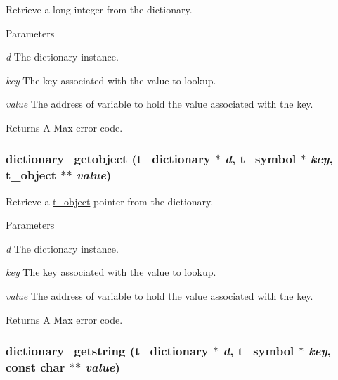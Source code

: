 Retrieve a long integer from the dictionary. 
\begin{DoxyParams}{Parameters}
\item[{\em d}]The dictionary instance. \item[{\em key}]The key associated with the value to lookup. \item[{\em value}]The address of variable to hold the value associated with the key. \end{DoxyParams}
\begin{DoxyReturn}{Returns}
A Max error code. 
\end{DoxyReturn}
\hypertarget{group__dictionary_gabcf91529e619908aebd380030c697052}{
\subsubsection[{dictionary\_\-getobject}]{ dictionary\_\-getobject ({\bf t\_\-dictionary} $\ast$ {\em d}, \/  {\bf t\_\-symbol} $\ast$ {\em key}, \/  {\bf t\_\-object} $\ast$$\ast$ {\em value})}}
\label{group__dictionary_gabcf91529e619908aebd380030c697052}


Retrieve a \hyperlink{structt__object}{t\_\-object} pointer from the dictionary. 
\begin{DoxyParams}{Parameters}
\item[{\em d}]The dictionary instance. \item[{\em key}]The key associated with the value to lookup. \item[{\em value}]The address of variable to hold the value associated with the key. \end{DoxyParams}
\begin{DoxyReturn}{Returns}
A Max error code. 
\end{DoxyReturn}
\hypertarget{group__dictionary_gaee590f1bcea90856a26e5806637c2830}{
\subsubsection[{dictionary\_\-getstring}]{ dictionary\_\-getstring ({\bf t\_\-dictionary} $\ast$ {\em d}, \/  {\bf t\_\-symbol} $\ast$ {\em key}, \/  const char $\ast$$\ast$ {\em value})}}
\label{group__dictionary_gaee590f1bcea90856a26e5806637c2830}


